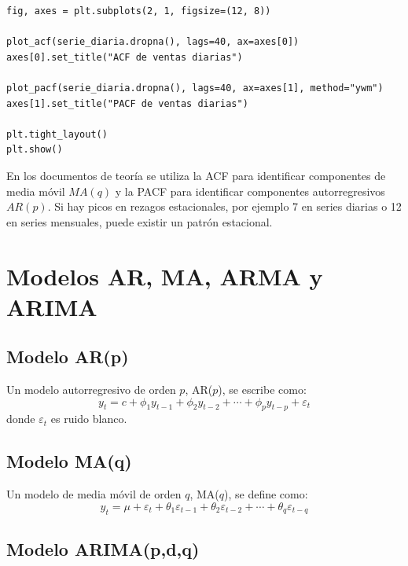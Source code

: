 \documentclass[12pt,a4paper]{article}
\begin{document}
\begin{lstlisting}[style=pythonstyle]
fig, axes = plt.subplots(2, 1, figsize=(12, 8))

plot_acf(serie_diaria.dropna(), lags=40, ax=axes[0])
axes[0].set_title("ACF de ventas diarias")

plot_pacf(serie_diaria.dropna(), lags=40, ax=axes[1], method="ywm")
axes[1].set_title("PACF de ventas diarias")

plt.tight_layout()
plt.show()
\end{lstlisting}

\begin{interpretacion}
En los documentos de teoría se utiliza la ACF para identificar componentes de media móvil \(MA(q)\) y la PACF para identificar componentes autorregresivos \(AR(p)\). Si hay picos en rezagos estacionales, por ejemplo 7 en series diarias o 12 en series mensuales, puede existir un patrón estacional.
\end{interpretacion}

\section{Modelos AR, MA, ARMA y ARIMA}

\subsection{Modelo AR(p)}

\begin{latexcell}
Un modelo autorregresivo de orden \(p\), AR(\(p\)), se escribe como:
\[
y_t = c + \phi_1 y_{t-1} + \phi_2 y_{t-2} + \cdots + \phi_p y_{t-p} + \varepsilon_t
\]
donde \(\varepsilon_t\) es ruido blanco.
\end{latexcell}

\subsection{Modelo MA(q)}

\begin{latexcell}
Un modelo de media móvil de orden \(q\), MA(\(q\)), se define como:
\[
y_t = \mu + \varepsilon_t + \theta_1 \varepsilon_{t-1} + \theta_2 \varepsilon_{t-2} + \cdots + \theta_q \varepsilon_{t-q}
\]
\end{latexcell}

\subsection{Modelo ARIMA(p,d,q)}
\end{document}
